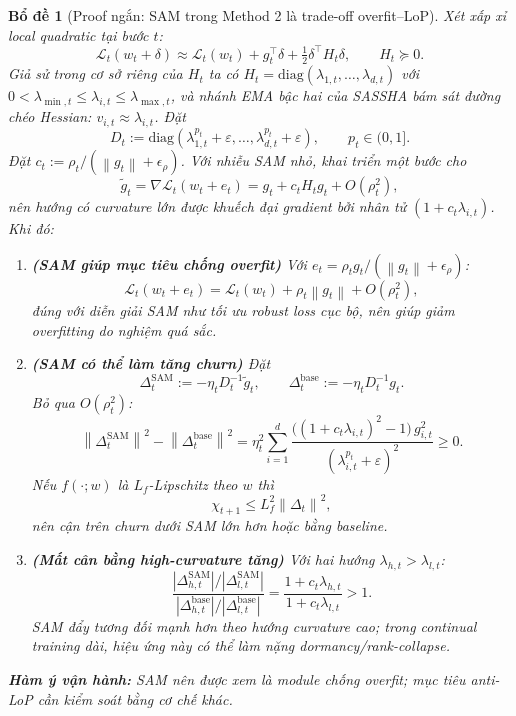 \documentclass[11pt]{article}
\newcommand{\norm}[1]{\left\lVert #1 \right\rVert}
\newcommand{\diag}{\mathrm{diag}}
\newtheorem{lemma}{Bổ đề}[section]
\begin{document}
\begin{lemma}[Proof ngắn: SAM trong Method 2 là trade-off overfit--LoP]
Xét xấp xỉ local quadratic tại bước $t$:
\[
\mathcal{L}_t(w_t+\delta)\approx \mathcal{L}_t(w_t)+g_t^\top\delta+\tfrac12\delta^\top H_t\delta,\qquad H_t\succeq 0.
\]
Giả sử trong cơ sở riêng của $H_t$ ta có $H_t=\diag(\lambda_{1,t},\dots,\lambda_{d,t})$ với
$0<\lambda_{\min,t}\le \lambda_{i,t}\le \lambda_{\max,t}$, và nhánh EMA bậc hai của SASSHA bám sát đường chéo Hessian:
$v_{i,t}\approx \lambda_{i,t}$. Đặt
\[
D_t:=\diag(\lambda_{1,t}^{p_t}+\varepsilon,\dots,\lambda_{d,t}^{p_t}+\varepsilon),\qquad p_t\in(0,1].
\]
Đặt $c_t:=\rho_t/(\norm{g_t}+\epsilon_\rho)$. Với nhiễu SAM nhỏ, khai triển một bước cho
\[
\tilde g_t
=
\nabla \mathcal{L}_t(w_t+e_t)
=
g_t+c_tH_tg_t+O(\rho_t^2),
\]
nên hướng có curvature lớn được khuếch đại gradient bởi nhân tử $(1+c_t\lambda_{i,t})$.
Khi đó:
\begin{enumerate}
\item \textbf{(SAM giúp mục tiêu chống overfit)} Với $e_t=\rho_t g_t/(\norm{g_t}+\epsilon_\rho)$:
\[
\mathcal{L}_t(w_t+e_t)
=
\mathcal{L}_t(w_t)+\rho_t\norm{g_t}+O(\rho_t^2),
\]
đúng với diễn giải SAM như tối ưu robust loss cục bộ, nên giúp giảm overfitting do nghiệm quá sắc.

\item \textbf{(SAM có thể làm tăng churn)} Đặt
\[
\Delta_t^{\mathrm{SAM}}:=-\eta_tD_t^{-1}\tilde g_t,\qquad
\Delta_t^{\mathrm{base}}:=-\eta_tD_t^{-1}g_t.
\]
Bỏ qua $O(\rho_t^2)$:
\[
\norm{\Delta_t^{\mathrm{SAM}}}^2-\norm{\Delta_t^{\mathrm{base}}}^2
=
\eta_t^2\sum_{i=1}^{d}
\frac{\big((1+c_t\lambda_{i,t})^2-1\big)\,g_{i,t}^2}{(\lambda_{i,t}^{p_t}+\varepsilon)^2}
\ge 0.
\]
Nếu $f(\cdot;w)$ là $L_f$-Lipschitz theo $w$ thì
\[
\chi_{t+1}\le L_f^2\norm{\Delta_t}^2,
\]
nên cận trên churn dưới SAM lớn hơn hoặc bằng baseline.

\item \textbf{(Mất cân bằng high-curvature tăng)} Với hai hướng $\lambda_{h,t}>\lambda_{l,t}$:
\[
\frac{\left|\Delta_{h,t}^{\mathrm{SAM}}\right|/\left|\Delta_{l,t}^{\mathrm{SAM}}\right|}
{\left|\Delta_{h,t}^{\mathrm{base}}\right|/\left|\Delta_{l,t}^{\mathrm{base}}\right|}
=
\frac{1+c_t\lambda_{h,t}}{1+c_t\lambda_{l,t}}
>1.
\]
SAM đẩy tương đối mạnh hơn theo hướng curvature cao; trong continual training dài, hiệu ứng này có thể làm nặng dormancy/rank-collapse.
\end{enumerate}
\textbf{Hàm ý vận hành:} SAM nên được xem là module chống overfit; mục tiêu anti-LoP cần kiểm soát bằng cơ chế khác.
\end{lemma}
\end{document}
